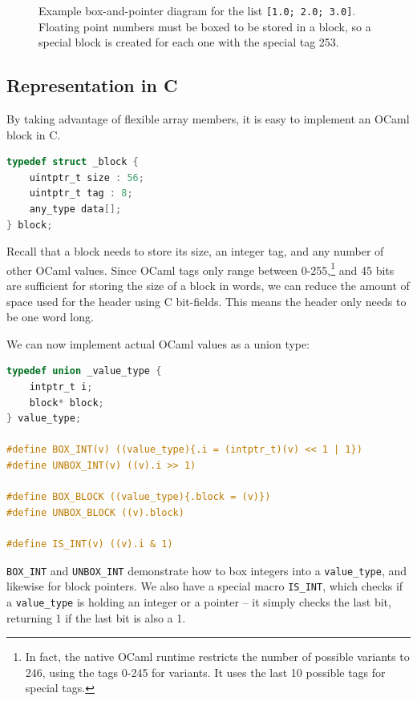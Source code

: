 \begin{figure}
    \centering
    
    \caption{Example box-and-pointer diagram for the list \texttt{[1.0; 2.0;
        3.0]}. Floating point numbers must be boxed to be stored in a block, so
        a special block is created for each one with the special tag 253.}\label{fig:block-example}
\end{figure}

\subsection{Representation in C}\label{c-repr}

By taking advantage of flexible array members, it is easy to implement an OCaml 
block in C.

\begin{lstlisting}[language=C]
typedef struct _block {
    uintptr_t size : 56;
    uintptr_t tag : 8;
    any_type data[];
} block;
\end{lstlisting}

Recall that a block needs to store its size, an integer tag, and any number of
other OCaml values. Since OCaml tags only range between 0-255,\footnote{In fact,
    the native OCaml runtime restricts the number of possible variants to 246,
    using the tags 0-245 for variants. It uses the last 10 possible tags for
special tags.} and 45 bits are sufficient for storing the size of a block in
words, we can reduce the amount of space used for the header using C bit-fields.
This means the header only needs to be one word long.

We can now implement actual OCaml values as a union type:

\begin{lstlisting}[language=C]
typedef union _value_type {
    intptr_t i;
    block* block;
} value_type;

#define BOX_INT(v) ((value_type){.i = (intptr_t)(v) << 1 | 1})
#define UNBOX_INT(v) ((v).i >> 1)

#define BOX_BLOCK ((value_type){.block = (v)})
#define UNBOX_BLOCK ((v).block)

#define IS_INT(v) ((v).i & 1)
\end{lstlisting}

\verb|BOX_INT| and \verb|UNBOX_INT| demonstrate how to box integers into a 
\verb|value_type|, and likewise for block pointers. We also have a special 
macro \verb|IS_INT|, which checks if a \verb|value_type| is holding an integer 
or a pointer -- it simply checks the last bit, returning 1 if the last bit is 
also a 1.

